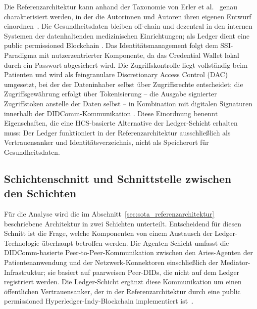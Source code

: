 Die Referenzarchitektur kann anhand der Taxonomie von Erler et al.~\cite{erler2024} genau charakterisiert werden, in der die Autorinnen und Autoren ihren eigenen Entwurf einordnen~\cite{erler2024}. Die Gesundheitsdaten bleiben off-chain und dezentral in den internen Systemen der datenhaltenden medizinischen Einrichtungen; als Ledger dient eine public permissioned Blockchain \cite{erler2023}. Das Identitätsmanagement folgt dem SSI-Paradigma mit nutzerzentrierter Komponente, da das Credential Wallet lokal durch ein Passwort abgesichert wird. Die Zugriffskontrolle liegt vollständig beim Patienten und wird als feingranulare Discretionary Access Control (DAC) umgesetzt, bei der der Dateninhaber selbst über Zugriffsrechte entscheidet; die Zugriffsgewährung erfolgt über Tokenisierung -- die Ausgabe signierter Zugriffstoken anstelle der Daten selbst -- in Kombination mit digitalen Signaturen innerhalb der DIDComm-Kommunikation \cite{erler2024}. Diese Einordnung benennt Eigenschaften, die eine HCS-basierte Alternative der Ledger-Schicht erhalten muss: Der Ledger funktioniert in der Referenzarchitektur ausschließlich als Vertrauensanker und Identitätsverzeichnis, nicht als Speicherort für Gesundheitsdaten.

\subsection{Schichtenschnitt und Schnittstelle zwischen den Schichten}
\label{subsec:schichtenstruktur}
Für die Analyse wird die im Abschnitt~\ref{sec:sota_referenzarchitektur} beschriebene Architektur in zwei Schichten unterteilt. Entscheidend für diesen Schnitt ist die Frage, welche Komponenten von einem Austausch der Ledger-Technologie überhaupt betroffen werden. Die Agenten-Schicht umfasst die DIDComm-basierte Peer-to-Peer-Kommunikation zwischen den Aries-Agenten der Patientenanwendung und der Netzwerk-Konnektoren einschließlich der Mediator-Infrastruktur; sie basiert auf paarweisen Peer-DIDs, die nicht auf dem Ledger registriert werden. Die Ledger-Schicht ergänzt diese Kommunikation um einen öffentlichen Vertrauensanker, der in der Referenzarchitektur durch eine public permissioned Hyperledger-Indy-Blockchain implementiert ist~\cite{erler2023}.

